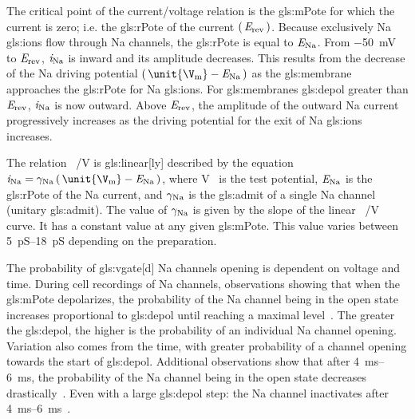 \documentclass[class={myRUCProject}, crop=false]{standalone}
\begin{document}
The critical point of the current/voltage relation is the \gls{gls:mPote} for which the current is zero; i.e. the \gls{gls:rPote} of the current \(\left(\,\mathit{E}_\mathrm{rev}\,\right)\). 
Because exclusively \gls{Na} \glspl{gls:ion} flow through \gls{Na} channels, the \gls{gls:rPote} is equal to \(\mathit{E}_\mathrm{Na}\). 
From \qty{-50}{\mV} to \(\mathit{E}_\mathrm{rev}\), \(\mathit{i}_\mathrm{Na}\) is inward and its amplitude decreases. This results from the decrease of the \gls{Na} driving potential \(\br{\unit{\V\membrane}-\equi\sodium}\) as the \gls{gls:membrane} approaches the \gls{gls:rPote} for \gls{Na} \glspl{gls:ion}. 
For \glspl{gls:membrane} \gls{gls:depol} greater than \(\mathit{E}_\mathrm{rev}\), \(\mathit{i}_\mathrm{Na}\) is now outward. Above \(\mathit{E}_\mathrm{rev}\), the amplitude of the outward \gls{Na} current progressively increases as the driving potential for the exit of \gls{Na} \glspl{gls:ion} increases. 

The relation \unit[per-mode = symbol]{\ucur\sodium\per\V} is \gls{gls:linear}[ly] described by the equation \(\ucur\sodium = \ucon\sodium \br{\unit{\V\membrane}-\equi\sodium}\), where \unit{\V\membrane} is the test potential, \(\mathit{E}_\mathrm{Na}\) is the \gls{gls:rPote} of the \gls{Na} current, and \(\gamma_\mathrm{Na}\) is the \gls{gls:admit} of a single \gls{Na} channel (unitary \gls{gls:admit}). The value of \(\gamma_\mathrm{Na}\) is given by the slope of the linear \unit[per-mode = symbol]{\ucur\sodium\per\V} curve. It has a constant value at any given \gls{gls:mPote}. This value varies between \qtyrange{5}{18}{\pico\siemens} depending on the preparation.

The probability of \gls{gls:vgate}[d] \gls{Na} channels opening is dependent on voltage and time. 
During cell recordings of \gls{Na} channels, observations showing that when the \gls{gls:mPote} depolarizes, the probability of the \gls{Na} channel being in the open state increases proportional to \gls{gls:depol} until reaching a maximal level~\cite{Hammond2015ch4}. 
The greater the \gls{gls:depol}, the higher is the probability of an individual \gls{Na} channel opening. 
Variation also comes from the time, with greater probability of a channel opening towards the start of \gls{gls:depol}.
Additional observations show that after \qtyrange{4}{6}{\ms}, the probability of the \gls{Na} channel being in the open state decreases drastically~\cite{Hammond2015ch4}. 
Even with a large \gls{gls:depol} step: the \gls{Na} channel inactivates after \qtyrange{4}{6}{\ms}~\cite{Hammond2015ch4}. 
\end{document}
